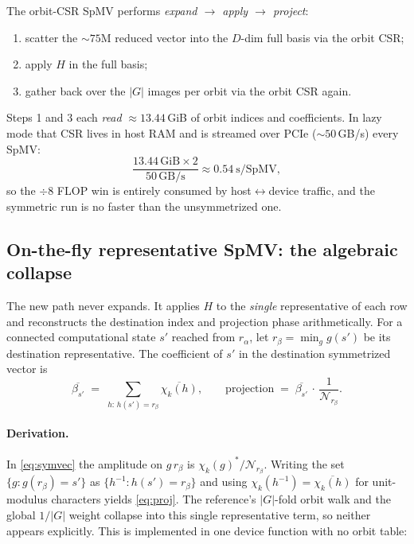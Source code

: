 \documentclass[11pt]{article}
\newcommand{\Norm}{\mathcal{N}}
\begin{document}
The orbit-CSR SpMV performs \emph{expand $\rightarrow$ apply $\rightarrow$
project}:
\begin{enumerate}
  \item scatter the ${\sim}75$M reduced vector into the $D$-dim full basis via
        the orbit CSR;
  \item apply $H$ in the full basis;
  \item gather back over the $|G|$ images per orbit via the orbit CSR again.
\end{enumerate}
Steps 1 and 3 each \emph{read} ${\approx}13.44$\,GiB of orbit indices and
coefficients. In lazy mode that CSR lives in host RAM and is streamed over PCIe
(${\sim}50$\,GB/s) every SpMV:
\[
  \frac{13.44\,\text{GiB}\times 2}{50\,\text{GB/s}} \approx 0.54\ \text{s/SpMV},
\]
so the $\div 8$ FLOP win is entirely consumed by host$\leftrightarrow$device
traffic, and the symmetric run is no faster than the unsymmetrized one.

\subsection{On-the-fly representative SpMV: the algebraic collapse}

The new path never expands. It applies $H$ to the \emph{single} representative of
each row and reconstructs the destination index and projection phase
arithmetically. For a connected computational state $s'$ reached from
$r_\alpha$, let $r_\beta=\min_g g(s')$ be its destination representative. The
coefficient of $s'$ in the destination symmetrized vector is
\begin{equation}
  \overline{\beta_{s'}}
   \;=\; \sum_{h:\,h(s')=r_\beta}\overline{\chi_k(h)},
  \qquad
  \text{projection} \;=\; \overline{\beta_{s'}}\,\cdot\,\frac{1}{\Norm_{r_\beta}} .
  \label{eq:proj}
\end{equation}

\paragraph{Derivation.} In \eqref{eq:symvec} the amplitude on $g\,r_\beta$ is
$\chi_k(g)^{*}/\Norm_{r_\beta}$. Writing the set $\{g : g(r_\beta)=s'\}$ as
$\{h^{-1}: h(s')=r_\beta\}$ and using $\chi_k(h^{-1})=\overline{\chi_k(h)}$ for
unit-modulus characters yields \eqref{eq:proj}. The reference's $|G|$-fold orbit
walk and the global $1/|G|$ weight collapse into this single representative
term, so neither appears explicitly. This is implemented in one device
function with no orbit table:
\end{document}
